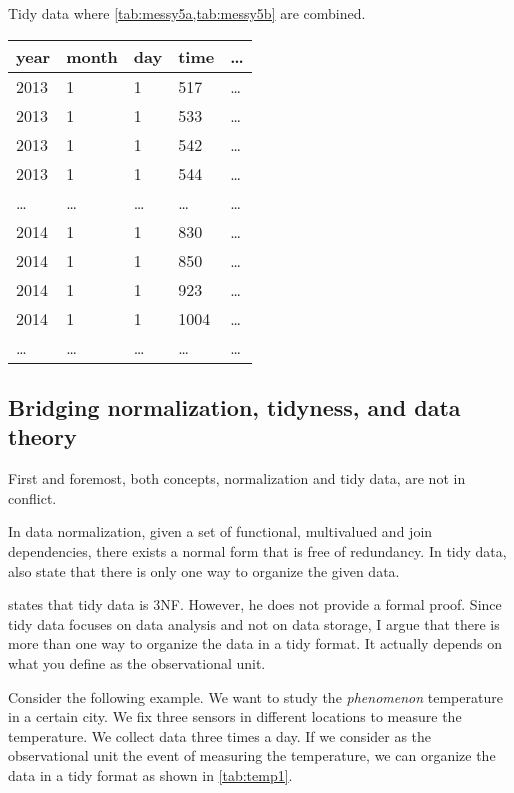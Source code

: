 \begin{tablebox}[label=tab:tidy5]{Tidy data where \cref{tab:messy5a,tab:messy5b} are combined.}
  \centering
  \begin{tabular}{lllll}
    \toprule
    year & month & day & time & \dots \\
    \midrule
    2013 & 1 & 1 & 517 & \dots \\
    2013 & 1 & 1 & 533 & \dots \\
    2013 & 1 & 1 & 542 & \dots \\
    2013 & 1 & 1 & 544 & \dots \\
    \dots & \dots & \dots & \dots & \dots \\
    2014 & 1 & 1 & 830 & \dots \\
    2014 & 1 & 1 & 850 & \dots \\
    2014 & 1 & 1 & 923 & \dots \\
    2014 & 1 & 1 & 1004 & \dots \\
    \dots & \dots & \dots & \dots & \dots \\
    \bottomrule
  \end{tabular}
\end{tablebox}

\subsection{Bridging normalization, tidyness, and data theory}
\label{sub:bridge}

First and foremost, both concepts, normalization and tidy data, are not in conflict.

In data normalization, given a set of functional, multivalued and join dependencies, there
exists a normal form that is free of redundancy.  In tidy data,
\citeauthor{Wickham2023} also state that there is only one way to organize the given data.

\textcite{Wickham2014} states that tidy data is 3NF.  However, he does not provide a
formal proof.  Since tidy data focuses on data analysis and not on data storage, I argue
that there is more than one way to organize the data in a tidy format.  It actually
depends on what you define as the observational unit.

Consider the following example.  We want to study the \emph{phenomenon} temperature in a
certain city.  We fix three sensors in different locations to measure the temperature.  We
collect data three times a day.  If we consider as the observational unit the
event of measuring the temperature, we can organize the data in a tidy format as shown in
\cref{tab:temp1}.

